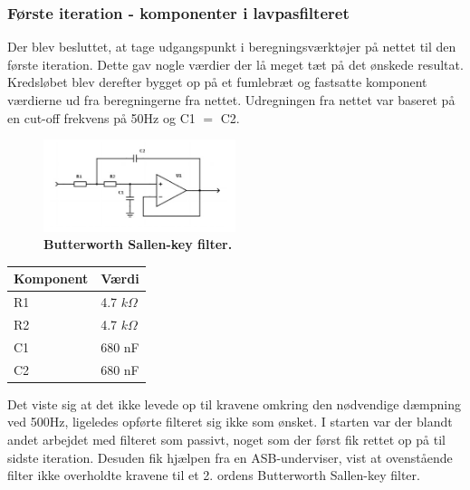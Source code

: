 \subsubsection{Første iteration - komponenter i lavpasfilteret}
Der blev besluttet, at tage udgangspunkt i beregningsværktøjer på nettet \cite{filter}  til den første iteration. Dette gav nogle værdier der lå meget tæt på det ønskede resultat. Kredsløbet blev derefter bygget op på et fumlebræt og fastsatte komponent værdierne ud fra beregningerne fra nettet. Udregningen fra nettet var baseret på en cut-off frekvens på 50Hz og C1 $=$ C2.
\begin{figure}[H]
\includegraphics[width =0.5\textwidth , center]{billeder/butterworth}
\caption{\textbf{Butterworth Sallen-key filter.}}
\end{figure}
\begin{table}[H]
\begin{tabular}{| l | l |}
   \hline
   Komponent & Værdi\\ \hline
   R1 & 4.7 $k\Omega$ \\ \hline
   R2 & 4.7 $k\Omega$ \\ \hline
   C1 & 680 nF\\\hline
   C2 & 680 nF\\\hline
\end{tabular}
\end{table}
Det viste sig at det ikke levede op til kravene omkring den nødvendige dæmpning ved 500Hz, ligeledes opførte filteret sig ikke som ønsket. I starten var der blandt andet arbejdet med filteret som passivt, noget som der først fik rettet op på til sidste iteration. Desuden fik hjælpen fra en ASB-underviser, vist at ovenstående filter ikke overholdte kravene til et 2. ordens Butterworth Sallen-key filter. 
